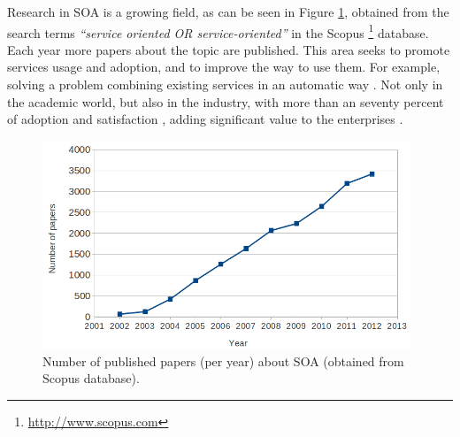 Research in SOA \cite{Papazoglou2007SOA} is a growing field, %
as can be seen in Figure \ref{fig:soapapers}, obtained from the search
terms {\em ``service oriented OR service-oriented''} in the Scopus
\footnote{\url{http://www.scopus.com}} database. Each year more papers
about the topic are published. This area seeks to promote services
usage and adoption, and to improve the way to use them. For example,
solving a problem combining existing services in an automatic way
\cite{Moussa2010ServiceComposition}. %
Not only in the academic world, but also in the industry, with more than an 
seventy percent of adoption and satisfaction \cite{Heffner10strong}, adding significant value to the enterprises \cite{Heffner13soa}.




\begin{figure}
\centering
\includegraphics[width=26pc]{gfx/soa/papersYear.png}
\caption{Number of published papers (per year) about SOA (obtained from Scopus database).}
\label{fig:soapapers}
\end{figure}



